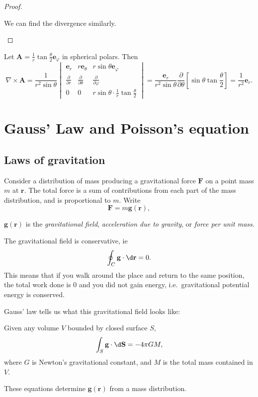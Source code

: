 \documentclass[a4paper]{article}
\begin{document}
\begin{proof}
\begin{enumerate}
      We can find the divergence similarly.\qedhere
  \end{enumerate}
\end{proof}

\begin{eg}
  Let $\mathbf{A} = \frac{1}{r}\tan \frac{\theta}{2} \mathbf{e}_\varphi$ in spherical polars. Then
  \[
    \nabla\times \mathbf{A} = \frac{1}{r^2\sin \theta}
    \begin{vmatrix}
      \mathbf{e}_r & r\mathbf{e}_\theta & r\sin \theta \mathbf{e}_\varphi\\
      \frac{\partial}{\partial r} & \frac{\partial}{\partial \theta} & \frac{\partial}{\partial \varphi}\\
      0 & 0 & r\sin \theta \cdot \frac{1}{r}\tan \frac{\theta}{2}
    \end{vmatrix} = \frac{\mathbf{e}_r}{r^2\sin \theta}\frac{\partial}{\partial \theta}\left[\sin \theta\tan \frac{\theta}{2}\right] = \frac{1}{r^2}\mathbf{e}_r.
  \]
\end{eg}

\section{Gauss' Law and Poisson's equation}
\subsection{Laws of gravitation}
Consider a distribution of mass producing a gravitational force $\mathbf{F}$ on a point mass $m$ at $\mathbf{r}$. The total force is a sum of contributions from each part of the mass distribution, and is proportional to $m$. Write
\[
  \mathbf{F} = m\mathbf{g}(\mathbf{r}),
\]
\begin{defi}
  $\mathbf{g}(\mathbf{r})$ is the \emph{gravitational field}, \emph{acceleration due to gravity}, or \emph{force per unit mass}.
\end{defi}
The gravitational field is conservative, ie
\[
  \oint_C \mathbf{g}\cdot \d \mathbf{r} = 0.
\]
This means that if you walk around the place and return to the same position, the total work done is $0$ and you did not gain energy, i.e.\ gravitational potential energy is conserved.

Gauss' law tells us what this gravitational field looks like:
\begin{law}
  Given any volume $V$ bounded by closed surface $S$,
  \[
    \int_S \mathbf{g}\cdot \d \mathbf{S} = -4\pi GM,
  \]
  where $G$ is Newton's gravitational constant, and $M$ is the total mass contained in $V$.
\end{law}
These equations determine $\mathbf{g}(\mathbf{r})$ from a mass distribution.
\end{document}
